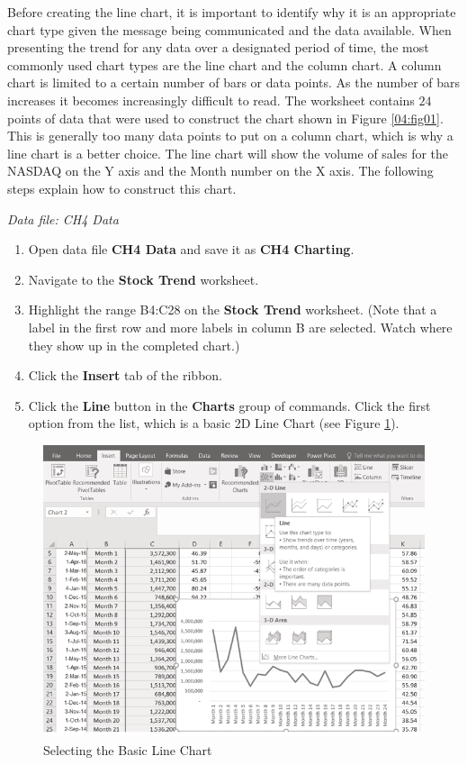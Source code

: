 Before creating the line chart, it is important to identify why it is an appropriate chart type given the message being communicated and the data available. When presenting the trend for any data over a designated period of time, the most commonly used chart types are the line chart and the column chart. A column chart is limited to a certain number of bars or data points. As the number of bars increases it becomes increasingly difficult to read. The worksheet contains $ 24 $ points of data that were used to construct the chart shown in Figure \ref{04:fig01}. This is generally too many data points to put on a column chart, which is why a line chart is a better choice. The line chart will show the volume of sales for the NASDAQ on the Y axis and the Month number on the X axis. The following steps explain how to construct this chart.

\textit{Data file: CH4 Data}

\begin{enumerate}
	\item Open data file \textbf{CH4 Data} and save it as \textbf{CH4 Charting}.
	\item Navigate to the \textbf{Stock Trend} worksheet.
	\item Highlight the range \textsf{B4:C28} on the \textbf{Stock Trend} worksheet. (Note that a label in the first row and more labels in column B are selected. Watch where they show up in the completed chart.)
	\item Click the \textbf{Insert} tab of the ribbon.
	\item Click the \textbf{Line} button in the \textbf{Charts} group of commands. Click the first option from the list, which is a basic 2D Line Chart (see Figure \ref{04:fig02}).
\end{enumerate}

\begin{figure}[H]
	\centering
	\includegraphics[width=\maxwidth{.95\linewidth}]{gfx/ch04_fig02}
	\caption{Selecting the Basic Line Chart}
	\label{04:fig02}
\end{figure}

